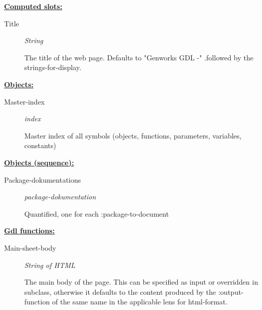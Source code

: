 \documentclass [11pt]{book}
\begin{document}
\begin{itemize}
\begin{description}
\end{description}






\textbf{
\underline{Computed slots:}}

\begin{description}

\item [Title]
\emph{String}

 The title of the web page. Defaults to "Genworks GDL -"
.followed by the strings-for-display.




\end{description}






\textbf{
\underline{Objects:}}

\begin{description}

\item [Master-index]
\emph{index}

 Master index of all symbols (objects, functions, parameters, variables, constants)




\end{description}






\textbf{
\underline{Objects (sequence):}}

\begin{description}

\item [Package-dokumentations]
\emph{package-dokumentation}

 Quantified, one for each :package-to-document




\end{description}






\textbf{
\underline{Gdl functions:}}

\begin{description}

\item [Main-sheet-body]
\emph{String of HTML}

 The main body of the page.
This can be specified as input or overridden in subclass, otherwise it defaults
to the content produced by the :output-function of the same name
in the applicable lens for  html-format.





\end{description}
\end{itemize}
\end{document}
